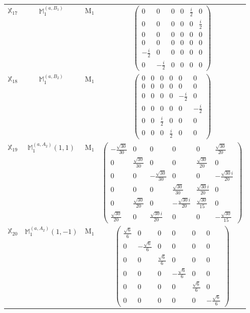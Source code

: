 \documentclass[fleqn,10pt,landscape]{article}
\begin{document}
\begin{itemize}
\begin{center}
\begin{longtable}{c|c|c|c}
$ \mathbb{X}_{17} $ & $\mathbb{M}_{1}^{(a,B_{1})}$ & M$_{1}$ & $\begin{pmatrix} 0 & 0 & 0 & 0 & \frac{i}{2} & 0 \\ 0 & 0 & 0 & 0 & 0 & \frac{i}{2} \\ 0 & 0 & 0 & 0 & 0 & 0 \\ 0 & 0 & 0 & 0 & 0 & 0 \\ - \frac{i}{2} & 0 & 0 & 0 & 0 & 0 \\ 0 & - \frac{i}{2} & 0 & 0 & 0 & 0 \end{pmatrix}$ \\
$ \mathbb{X}_{18} $ & $\mathbb{M}_{1}^{(a,B_{2})}$ & M$_{1}$ & $\begin{pmatrix} 0 & 0 & 0 & 0 & 0 & 0 \\ 0 & 0 & 0 & 0 & 0 & 0 \\ 0 & 0 & 0 & 0 & - \frac{i}{2} & 0 \\ 0 & 0 & 0 & 0 & 0 & - \frac{i}{2} \\ 0 & 0 & \frac{i}{2} & 0 & 0 & 0 \\ 0 & 0 & 0 & \frac{i}{2} & 0 & 0 \end{pmatrix}$ \\
$ \mathbb{X}_{19} $ & $\mathbb{M}_{1}^{(a,A_{2})}(1,1)$ & M$_{1}$ & $\begin{pmatrix} - \frac{\sqrt{30}}{30} & 0 & 0 & 0 & 0 & \frac{\sqrt{30}}{20} \\ 0 & \frac{\sqrt{30}}{30} & 0 & 0 & \frac{\sqrt{30}}{20} & 0 \\ 0 & 0 & - \frac{\sqrt{30}}{30} & 0 & 0 & - \frac{\sqrt{30} i}{20} \\ 0 & 0 & 0 & \frac{\sqrt{30}}{30} & \frac{\sqrt{30} i}{20} & 0 \\ 0 & \frac{\sqrt{30}}{20} & 0 & - \frac{\sqrt{30} i}{20} & \frac{\sqrt{30}}{15} & 0 \\ \frac{\sqrt{30}}{20} & 0 & \frac{\sqrt{30} i}{20} & 0 & 0 & - \frac{\sqrt{30}}{15} \end{pmatrix}$ \\
$ \mathbb{X}_{20} $ & $\mathbb{M}_{1}^{(a,A_{2})}(1,-1)$ & M$_{1}$ & $\begin{pmatrix} \frac{\sqrt{6}}{6} & 0 & 0 & 0 & 0 & 0 \\ 0 & - \frac{\sqrt{6}}{6} & 0 & 0 & 0 & 0 \\ 0 & 0 & \frac{\sqrt{6}}{6} & 0 & 0 & 0 \\ 0 & 0 & 0 & - \frac{\sqrt{6}}{6} & 0 & 0 \\ 0 & 0 & 0 & 0 & \frac{\sqrt{6}}{6} & 0 \\ 0 & 0 & 0 & 0 & 0 & - \frac{\sqrt{6}}{6} \end{pmatrix}$ \\

\end{longtable}
\end{center}
\end{itemize}
\end{document}
